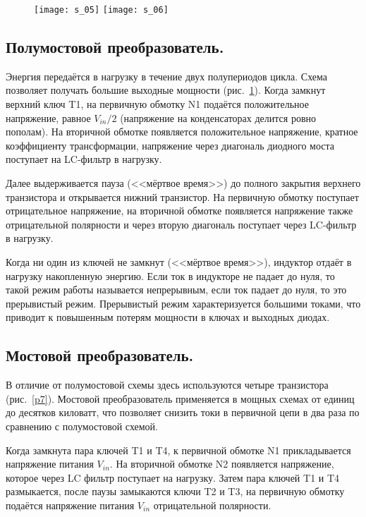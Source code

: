 \begin{figure}[ht]
	\texttt{[image: s\_05]} \hfill
	\texttt{[image: s\_06]}
	\parbox{.45\textwidth}{\caption{}\label{p5}} \hfill
	\parbox{.45\textwidth}{\caption{}\label{p6}}
\end{figure}

\subsection{Полумостовой преобразователь.}

Энергия передаётся в нагрузку в течение двух полупериодов цикла. Схема позволяет
получать большие выходные мощности (рис.~\ref{p6}). Когда замкнут верхний ключ
T1, на первичную обмотку N1 подаётся положительное напряжение, равное
\( V_{in}/2 \) (напряжение на конденсаторах делится ровно пополам). На
вторичной обмотке появляется положительное напряжение, кратное коэффициенту
трансформации, напряжение через диагональ диодного моста поступает на
LC-фильтр в нагрузку.

Далее выдерживается пауза (<<мёртвое время>>) до полного закрытия верхнего
транзистора и открывается нижний транзистор. На первичную обмотку поступает
отрицательное напряжение, на вторичной обмотке появляется напряжение также
отрицательной полярности и через вторую диагональ поступает через LC-фильтр в
нагрузку.

Когда ни один из ключей не замкнут (<<мёртвое время>>), индуктор отдаёт в
нагрузку накопленную энергию. Если ток в индукторе не падает до нуля, то такой
режим работы называется непрерывным, если ток падает до нуля, то это прерывистый
режим. Прерывистый режим характеризуется большими токами, что приводит к
повышенным потерям мощности в ключах и выходных диодах.
	
\subsection{Мостовой преобразователь.}

	В отличие от полумостовой схемы здесь используются четыре 
транзистора (рис.~\ref{p7}). Мостовой преобразователь применяется в мощных
схемах от единиц до десятков киловатт, что позволяет снизить токи в первичной
цепи в два раза по сравнению с полумостовой схемой.

Когда замкнута пара ключей T1 и T4, к первичной обмотке N1 прикладывается
напряжение питания \( V_{in} \). На вторичной обмотке N2 появляется напряжение,
которое через LC фильтр поступает
на нагрузку. Затем пара ключей T1 и T4 размыкается, после паузы замыкаются ключи
T2 и T3, на первичную обмотку подаётся напряжение питания \( V_{in} \)
отрицательной полярности.

